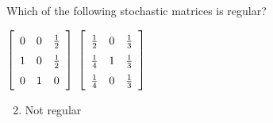 \begin{multicols}{2}
\begin{ex}
Which of the following stochastic matrices is regular?
\begin{exenumerate}
\exitem $\leftB \def\arraystretch{1.5}\begin{array}{ccc}
0 & 0 & \frac{1}{2} \\
1 & 0 & \frac{1}{2} \\
0 & 1 & 0
\end{array} \rightB$
\exitem $\leftB \def\arraystretch{1.5}\begin{array}{ccc}
\frac{1}{2} & 0 & \frac{1}{3} \\
\frac{1}{4} & 1 & \frac{1}{3} \\
\frac{1}{4} & 0 & \frac{1}{3}
\end{array} \rightB$
\end{exenumerate}
\begin{sol}
\begin{enumerate}[label={\alph*.}]
\setcounter{enumi}{1}
\item  Not regular

\end{enumerate}
\end{sol}
\end{ex}


\end{multicols}
